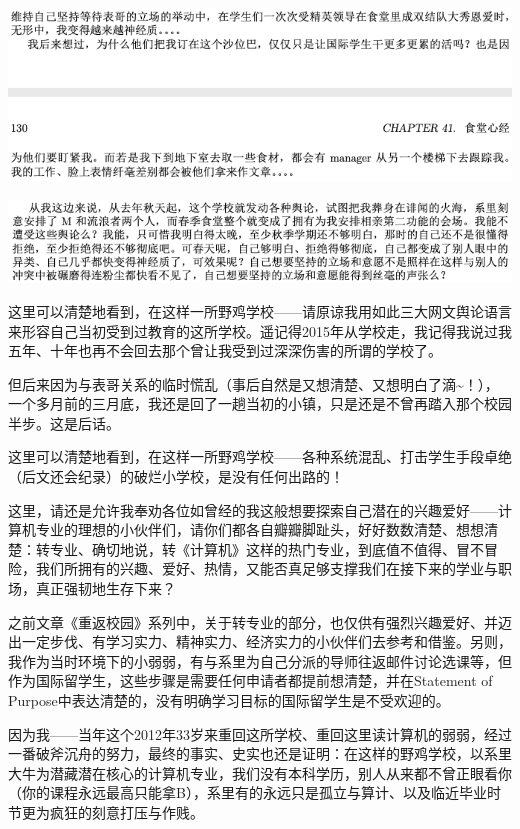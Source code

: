 \documentclass[9pt, b5paper]{article}
\begin{document}
\begin{center}
\includegraphics[width=.9\linewidth]{./pic/backups_plans_20210424_121700.png}
\end{center}

\begin{center}
\includegraphics[width=.9\linewidth]{./pic/backups_plans_20210424_121752.png}
\end{center}

这里可以清楚地看到，在这样一所野鸡学校——请原谅我用如此三大网文舆论语言来形容自己当初受到过教育的这所学校。遥记得2015年从学校走，我记得我说过我五年、十年也再不会回去那个曾让我受到过深深伤害的所谓的学校了。

但后来因为与表哥关系的临时慌乱（事后自然是又想清楚、又想明白了滴\textasciitilde{}！），一个多月前的三月底，我还是回了一趟当初的小镇，只是还是不曾再踏入那个校园半步。这是后话。

这里可以清楚地看到，在这样一所野鸡学校——各种系统混乱、打击学生手段卓绝（后文还会纪录）的破烂小学校，是没有任何出路的！

这里，请还是允许我奉劝各位如曾经的我这般想要探索自己潜在的兴趣爱好——计算机专业的理想的小伙伴们，请你们都各自瓣瓣脚趾头，好好数数清楚、想想清楚：转专业、确切地说，转《计算机》这样的热门专业，到底值不值得、冒不冒险，我们所拥有的兴趣、爱好、热情，又能否真足够支撑我们在接下来的学业与职场，真正强韧地生存下来？

之前文章《重返校园》系列中，关于转专业的部分，也仅供有强烈兴趣爱好、并迈出一定步伐、有学习实力、精神实力、经济实力的小伙伴们去参考和借鉴。另则，我作为当时环境下的小弱弱，有与系里为自己分派的导师往返邮件讨论选课等，但作为国际留学生，这些步骤是需要任何申请者都提前想清楚，并在Statement of Purpose中表达清楚的，没有明确学习目标的国际留学生是不受欢迎的。

因为我——当年这个2012年33岁来重回这所学校、重回这里读计算机的弱弱，经过一番破斧沉舟的努力，最终的事实、史实也还是证明：在这样的野鸡学校，以系里大牛为潜藏潜在核心的计算机专业，我们没有本科学历，别人从来都不曾正眼看你（你的课程永远最高只能拿B），系里有的永远只是孤立与算计、以及临近毕业时节更为疯狂的刻意打压与作贱。
\end{document}

